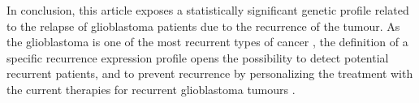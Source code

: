 \documentclass[9pt,twocolumn,twoside]{gsajnl}
\begin{document}
In conclusion, this article exposes a statistically significant genetic profile related to the relapse of glioblastoma patients due to the recurrence of the tumour. As the glioblastoma is one of the most recurrent types of cancer \citep{Bleeker2012}, the definition of a specific recurrence expression profile opens the possibility to detect potential recurrent patients, and to prevent recurrence by personalizing the treatment with the current therapies for recurrent glioblastoma tumours \citep{Weller2013}.


\end{document}

